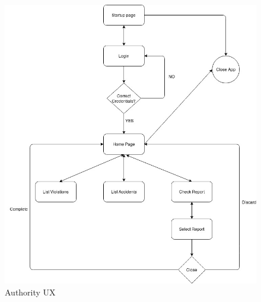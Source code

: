 \begin{figure} [H]
	\centering
    \includegraphics[scale=0.5]{Images/authority_ux.jpg}
    \caption{\label{fig:AuthorityUX}Authority UX}
    
\end{figure}